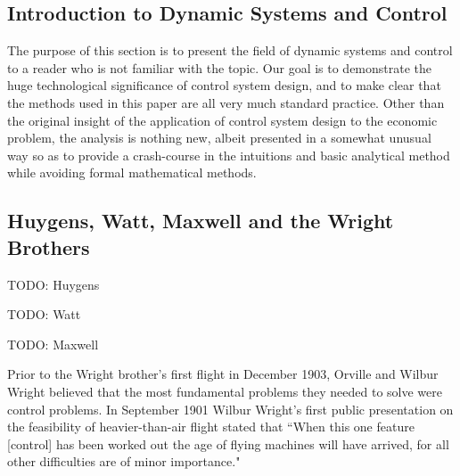 \subsection{Introduction to Dynamic Systems and Control}
\label{chapter:dynamic_systems_and_control}

The purpose of this section is to present the field of dynamic systems and control to a reader who
is not familiar with the topic. Our goal is to demonstrate the huge technological significance of
control system design, and to make clear that the methods used in this paper are all very much
standard practice. Other than the original insight of the application of control system design to
the economic problem, the analysis is nothing new, albeit presented in a somewhat unusual way so as
to provide a crash-course in the intuitions and basic analytical method while avoiding formal
mathematical methods.

\subsection{Huygens, Watt, Maxwell and the Wright Brothers}

TODO: Huygens

TODO: Watt

TODO: Maxwell

Prior to the Wright brother's first flight in December 1903, Orville and Wilbur Wright believed that
the most fundamental problems they needed to solve were control problems. In September 1901 Wilbur
Wright's first public presentation on the feasibility of heavier-than-air flight stated that ``When
this one feature [control] has been worked out the age of flying machines will have arrived, for all
other difficulties are of minor importance."\cite{wright1908}


